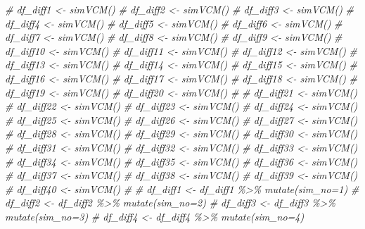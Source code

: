 \documentclass[
]{article}
\newenvironment{Shaded}{\begin{snugshade}}{\end{snugshade}}
\newcommand{\CommentTok}[1]{\textcolor[rgb]{0.56,0.35,0.01}{\textit{#1}}}
\begin{document}
\begin{Shaded}
\begin{Highlighting}[]
\CommentTok{\# df\_diff1 \textless{}{-} simVCM()}
\CommentTok{\# df\_diff2 \textless{}{-} simVCM()}
\CommentTok{\# df\_diff3 \textless{}{-} simVCM()}
\CommentTok{\# df\_diff4 \textless{}{-} simVCM()}
\CommentTok{\# df\_diff5 \textless{}{-} simVCM()}
\CommentTok{\# df\_diff6 \textless{}{-} simVCM()}
\CommentTok{\# df\_diff7 \textless{}{-} simVCM()}
\CommentTok{\# df\_diff8 \textless{}{-} simVCM()}
\CommentTok{\# df\_diff9 \textless{}{-} simVCM()}
\CommentTok{\# df\_diff10 \textless{}{-} simVCM()}
\CommentTok{\# df\_diff11 \textless{}{-} simVCM()}
\CommentTok{\# df\_diff12 \textless{}{-} simVCM()}
\CommentTok{\# df\_diff13 \textless{}{-} simVCM()}
\CommentTok{\# df\_diff14 \textless{}{-} simVCM()}
\CommentTok{\# df\_diff15 \textless{}{-} simVCM()}
\CommentTok{\# df\_diff16 \textless{}{-} simVCM()}
\CommentTok{\# df\_diff17 \textless{}{-} simVCM()}
\CommentTok{\# df\_diff18 \textless{}{-} simVCM()}
\CommentTok{\# df\_diff19 \textless{}{-} simVCM()}
\CommentTok{\# df\_diff20 \textless{}{-} simVCM()}
\CommentTok{\# }
\CommentTok{\# df\_diff21 \textless{}{-} simVCM()}
\CommentTok{\# df\_diff22 \textless{}{-} simVCM()}
\CommentTok{\# df\_diff23 \textless{}{-} simVCM()}
\CommentTok{\# df\_diff24 \textless{}{-} simVCM()}
\CommentTok{\# df\_diff25 \textless{}{-} simVCM()}
\CommentTok{\# df\_diff26 \textless{}{-} simVCM()}
\CommentTok{\# df\_diff27 \textless{}{-} simVCM()}
\CommentTok{\# df\_diff28 \textless{}{-} simVCM()}
\CommentTok{\# df\_diff29 \textless{}{-} simVCM()}
\CommentTok{\# df\_diff30 \textless{}{-} simVCM()}
\CommentTok{\# df\_diff31 \textless{}{-} simVCM()}
\CommentTok{\# df\_diff32 \textless{}{-} simVCM()}
\CommentTok{\# df\_diff33 \textless{}{-} simVCM()}
\CommentTok{\# df\_diff34 \textless{}{-} simVCM()}
\CommentTok{\# df\_diff35 \textless{}{-} simVCM()}
\CommentTok{\# df\_diff36 \textless{}{-} simVCM()}
\CommentTok{\# df\_diff37 \textless{}{-} simVCM()}
\CommentTok{\# df\_diff38 \textless{}{-} simVCM()}
\CommentTok{\# df\_diff39 \textless{}{-} simVCM()}
\CommentTok{\# df\_diff40 \textless{}{-} simVCM()}
\CommentTok{\# }
\CommentTok{\# df\_diff1 \textless{}{-} df\_diff1 \%\textgreater{}\% mutate(sim\_no=\textquotesingle{}1\textquotesingle{})}
\CommentTok{\# df\_diff2 \textless{}{-} df\_diff2 \%\textgreater{}\% mutate(sim\_no=\textquotesingle{}2\textquotesingle{})}
\CommentTok{\# df\_diff3 \textless{}{-} df\_diff3 \%\textgreater{}\% mutate(sim\_no=\textquotesingle{}3\textquotesingle{})}
\CommentTok{\# df\_diff4 \textless{}{-} df\_diff4 \%\textgreater{}\% mutate(sim\_no=\textquotesingle{}4\textquotesingle{})}

\end{Highlighting}
\end{Shaded}
\end{document}
